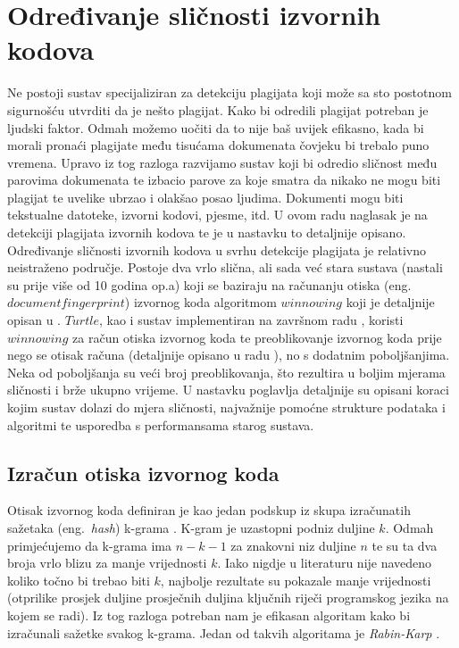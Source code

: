 \chapter{Određivanje sličnosti izvornih kodova}

Ne postoji sustav specijaliziran za detekciju plagijata koji može sa sto postotnom sigurnošću utvrditi da je nešto plagijat. Kako bi odredili plagijat potreban je ljudski faktor.  Odmah možemo uočiti da to nije baš uvijek efikasno, kada bi morali pronaći plagijate među tisućama dokumenata čovjeku bi trebalo puno vremena. Upravo iz tog razloga razvijamo sustav koji bi odredio sličnost među parovima dokumenata te izbacio parove za koje smatra da nikako ne mogu biti plagijat te uvelike ubrzao i olakšao posao ljudima. Dokumenti mogu biti tekstualne datoteke, izvorni kodovi, pjesme, itd. U ovom radu naglasak je na detekciji plagijata izvornih kodova te je u nastavku to detaljnije opisano. \\
	
	Određivanje sličnosti izvornih kodova u svrhu detekcije plagijata je relativno neistraženo područje. Postoje dva vrlo slična, ali sada već stara sustava (nastali su prije više od 10 godina op.a)  \cite{moss} \cite{jplag} koji se baziraju na računanju otiska (eng.~$document fingerprint$) izvornog koda algoritmom $winnowing$ koji je detaljnije opisan u \cite{winnowing}. $Turtle$, kao i sustav implementiran na završnom radu \cite{plagijator}, koristi $winnowing$ za račun otiska izvornog koda te preoblikovanje izvornog koda prije nego se otisak računa (detaljnije opisano u radu \cite{dorian}), no s dodatnim poboljšanjima. Neka od poboljšanja su veći broj preoblikovanja, što rezultira u boljim mjerama sličnosti i brže ukupno vrijeme. U nastavku poglavlja detaljnije su opisani koraci kojim sustav dolazi do mjera sličnosti, najvažnije pomoćne strukture podataka i algoritmi te usporedba s performansama starog sustava.

\section{Izračun otiska izvornog koda}

Otisak izvornog koda definiran je kao jedan podskup iz skupa izračunatih sažetaka (eng.~\textit{hash}) k-grama \cite{winnowing}. K-gram je uzastopni podniz duljine $k$. Odmah primjećujemo da k-grama ima $n-k-1$ za znakovni niz duljine $n$ te su ta dva broja vrlo blizu za manje vrijednosti $k$. Iako nigdje u literaturu nije navedeno koliko točno bi trebao biti $k$, najbolje rezultate su pokazale manje vrijednosti (otprilike prosjek duljine prosječnih duljina ključnih riječi programskog jezika na kojem se radi).  Iz tog razloga potreban nam je efikasan algoritam kako bi izračunali sažetke svakog k-grama. Jedan od takvih algoritama je \textit{Rabin-Karp} \cite{rabin-karp}.

